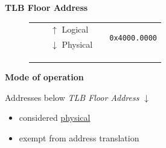 \documentclass{beamer}
\begin{document}
\begin{frame}
\begin{center}
\begin{block}{\textbf{{\small TLB Floor Address}}}
\begin{minipage}{0.65\textwidth}
\begin{figure}[h]
\begin{tabular}{rrrcl}
						                                                  &                                                   & \multicolumn{1}{l|}{{\tiny $\uparrow$ Logical}}    & \multicolumn{1}{c|}{\cellcolor{nord12}\multirow{-4}{*}{}} & \multirow{2}{*}{\texttt{{\tiny 0x4000.0000}}} \\ \hhline{~~--~}
						                                                  &                                                   & \multicolumn{1}{l|}{{\tiny $\downarrow$ Physical}} & \multicolumn{1}{c|}{\cellcolor{nord11}}                   &                                               \\
						                                                  &                                                   & \multicolumn{1}{r|}{}                              & \multicolumn{1}{c|}{\cellcolor{nord11}}                   &                                               \\
						                                                  &                                                   & \multicolumn{1}{r|}{}                              & \multicolumn{1}{c|}{\cellcolor{nord11}}                   &                                               \\
						                                                  &                                                   & \multicolumn{1}{r|}{}                              & \multicolumn{1}{c|}{\multirow{-4}{*}{\cellcolor{nord11}}} &                                               \\ \cline{4-4}
					\end{tabular}
				\end{figure}
			\end{minipage}
		\end{block}
		\begin{block}{\textbf{{\small Mode of operation}}}
			\vspace{0.2em}
			\begin{minipage}{0.45\textwidth}
				\begin{scriptsize}
					Addresses below \textit{TLB Floor Address} $\downarrow$
					\begin{itemize}
						\item considered \underline{physical}
						\item exempt from address translation
					\end{itemize}
				\end{scriptsize}

\end{minipage}
\end{block}
\end{center}
\end{frame}
\end{document}
